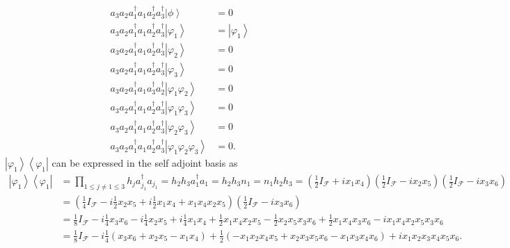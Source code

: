 \documentclass[aps,preprint]{revtex4}%
\begin{document}
\begin{align}
a_{3}a_{2}a_{1}^{\dagger}a_{1}a_{2}^{\dagger}a_{3}^{\dagger}\left\vert
\phi\right\rangle  &  =0\\
a_{3}a_{2}a_{1}^{\dagger}a_{1}a_{2}^{\dagger}a_{3}^{\dagger}\left\vert
\varphi_{1}\right\rangle  &  =\left\vert \varphi_{1}\right\rangle \\
a_{3}a_{2}a_{1}^{\dagger}a_{1}a_{2}^{\dagger}a_{3}^{\dagger}\left\vert
\varphi_{2}\right\rangle  &  =0\\
a_{3}a_{2}a_{1}^{\dagger}a_{1}a_{2}^{\dagger}a_{3}^{\dagger}\left\vert
\varphi_{3}\right\rangle  &  =0\\
a_{3}a_{2}a_{1}^{\dagger}a_{1}a_{3}^{\dagger}a_{2}^{\dagger}\left\vert
\varphi_{1}\varphi_{2}\right\rangle  &  =0\\
a_{3}a_{2}a_{1}^{\dagger}a_{1}a_{2}^{\dagger}a_{3}^{\dagger}\left\vert
\varphi_{1}\varphi_{3}\right\rangle  &  =0\\
a_{3}a_{2}a_{1}^{\dagger}a_{1}a_{2}^{\dagger}a_{3}^{\dagger}\left\vert
\varphi_{2}\varphi_{3}\right\rangle  &  =0\\
a_{3}a_{2}a_{1}^{\dagger}a_{1}a_{2}^{\dagger}a_{3}^{\dagger}\left\vert
\varphi_{1}\varphi_{2}\varphi_{3}\right\rangle  &  =0.
\end{align}
$\left\vert \varphi_{1}\right\rangle \left\langle \varphi_{1}\right\vert $ can
be expressed in the self adjoint basis as
\begin{align}
\left\vert \varphi_{1}\right\rangle \left\langle \varphi_{1}\right\vert  &  =%
{\displaystyle\prod\limits_{1\leq j\neq1\leq3}}
h_{j}a_{j_{1}}^{\dagger}a_{j_{1}}=h_{2}h_{3}a_{1}^{\dagger}a_{1}=h_{2}%
h_{3}n_{1}=n_{1}h_{2}h_{3}=\left(  \frac{1}{2}I_{\mathcal{F}}+ix_{1}%
x_{4}\right)  \left(  \frac{1}{2}I_{\mathcal{F}}-ix_{2}x_{5}\right)  \left(
\frac{1}{2}I_{\mathcal{F}}-ix_{3}x_{6}\right) \\
&  =\left(  \frac{1}{4}I_{\mathcal{F}}-i\frac{1}{2}x_{2}x_{5}+i\frac{1}%
{2}x_{1}x_{4}+x_{1}x_{4}x_{2}x_{5}\right)  \left(  \frac{1}{2}I_{\mathcal{F}%
}-ix_{3}x_{6}\right) \\
&  =\frac{1}{8}I_{\mathcal{F}}-i\frac{1}{4}x_{3}x_{6}-i\frac{1}{4}x_{2}%
x_{5}+i\frac{1}{4}x_{1}x_{4}+\frac{1}{2}x_{1}x_{4}x_{2}x_{5}-\frac{1}{2}%
x_{2}x_{5}x_{3}x_{6}+\frac{1}{2}x_{1}x_{4}x_{3}x_{6}-ix_{1}x_{4}x_{2}%
x_{5}x_{3}x_{6}\\
&  =\frac{1}{8}I_{\mathcal{F}}-i\frac{1}{4}\left(  x_{3}x_{6}+x_{2}x_{5}%
-x_{1}x_{4}\right)  +\frac{1}{2}\left(  -x_{1}x_{2}x_{4}x_{5}+x_{2}x_{3}%
x_{5}x_{6}-x_{1}x_{3}x_{4}x_{6}\right)  +ix_{1}x_{2}x_{3}x_{4}x_{5}x_{6}.
\end{align}
\end{document}
